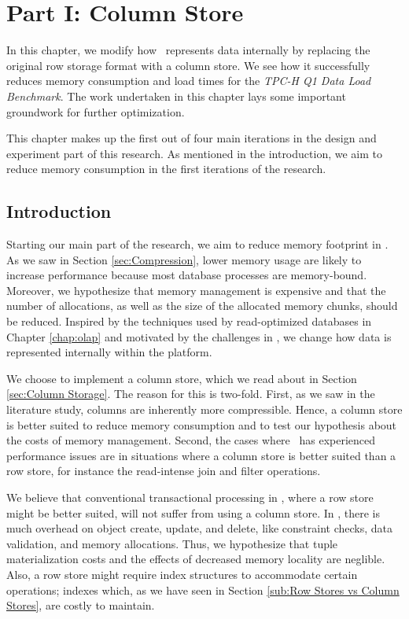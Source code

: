 \chapter{Part I: Column Store}
\label{chap:column-store}

In this chapter, we modify how \gap~represents data internally by replacing the original row storage format with a column store. We see how it successfully reduces memory consumption and load times for the \textit{TPC-H Q1 Data Load Benchmark}. The work undertaken in this chapter lays some important groundwork for further optimization.

This chapter makes up the first out of four main iterations in the design and experiment part of this research. As mentioned in the introduction, we aim to reduce memory consumption in the first iterations of the research. 

\clearpage

\section{Introduction}
\label{sec:Introduction}
Starting our main part of the research, we aim to reduce memory footprint in \gap. As we saw in Section \ref{sec:Compression}, lower memory usage are likely to increase performance because most database processes are memory-bound. Moreover, we hypothesize that memory management is expensive and that the number of allocations, as well as the size of the allocated memory chunks, should be reduced. Inspired by the techniques used by read-optimized databases in Chapter \ref{chap:olap} and motivated by the challenges in \gap, we change how data is represented internally within the platform.

We choose to implement a column store, which we read about in Section \ref{sec:Column Storage}. The reason for this is two-fold. First, as we saw in the literature study, columns are inherently more compressible. Hence, a column store is better suited to reduce memory consumption and to test our hypothesis about the costs of memory management. Second, the cases where \genus~has experienced performance issues are in situations where a column store is better suited than a row store, for instance the read-intense join and filter operations.

We believe that conventional transactional processing in \gap, where a row store might be better suited, will not suffer from using a column store. In \gap, there is much overhead on object create, update, and delete, like constraint checks, data validation, and memory allocations. Thus, we hypothesize that tuple materialization costs and the effects of decreased memory locality are neglible. Also, a row store might require index structures to accommodate certain operations; indexes which, as we have seen in Section \ref{sub:Row Stores vs Column Stores}, are costly to maintain.

